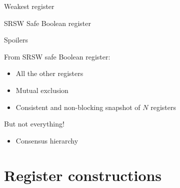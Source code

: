 \begin{frame}[fragile, t]{Weakest register}

SRSW Safe Boolean register



\end{frame}

\begin{frame}{Spoilers}

From SRSW safe Boolean register:
\begin{itemize}
  \pause
  \item All the other registers

  \pause
  \item Mutual exclusion

  \pause
  \item Consistent and non-blocking snapshot of $N$ registers
\end{itemize}

\pause

But not everything!
\begin{itemize}
  \item Consensus hierarchy
\end{itemize}

\end{frame}

\section{Register constructions}
\showTOC

